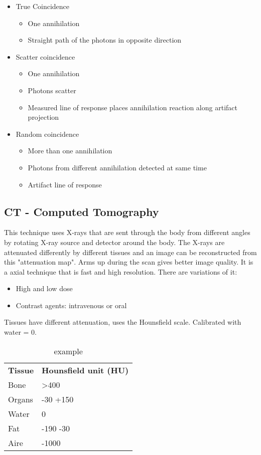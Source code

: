 			\begin{itemize}
			  	\item True Coincidence
			  	\begin{itemize}
			  		\item One annihilation
			  		\item Straight path of the photons in opposite direction 
			  	\end{itemize}
			  	\item Scatter coincidence
			  	\begin{itemize}
			  		\item One annihilation
			  		\item Photons scatter
			  		\item Measured line of response places annihilation reaction along artifact projection
			  	\end{itemize}
			  	\item Random coincidence
			  	\begin{itemize}
			  		\item More than one annihilation
			  		\item Photons from different annihilation detected at same time
			  		\item Artifact line of response 
			  	\end{itemize}
			  \end{itemize}  

	\subsection{CT - Computed Tomography}
	This technique uses X-rays that are sent through the body from different angles by rotating X-ray source and detector around the body. The X-rays are attenuated differently by different tissues and an image can be reconstructed from this "attenuation map". Arms up during the scan gives better image quality. It is a axial technique that is fast and high resolution. There are variations of it:
		\begin{itemize}
		  	\item High and low dose
		  	\item Contrast agents: intravenous or oral
		 \end{itemize}  
	Tissues have different attenuation, uses the Hounsfield scale. Calibrated with water = 0. 

		\begin{table}[ht!]
		\centering
		\begin{tabular}{ll}\hline
		 \textbf{Tissue}& \textbf{Hounsfield unit (HU)}   \\
		 Bone&    >400\\
		 Organs&   -30 +150\\
		 Water&    0\\
		 Fat&    -190 -30\\
		 Aire&    -1000\\ \hline
		\end{tabular}
		\caption{example}
		\label{tab:tab1}
		\end{table}

